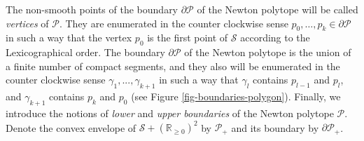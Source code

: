 \documentclass[12pt]{amsart}
\newtheorem{proposition}[theorem]{Proposition}
\begin{document}
The non-smooth points of the boundary $\partial\mathcal{P}$ of the Newton polytope will be called \emph{vertices} of $\mathcal{P}$. They are enumerated in the counter clockwise sense $p_{0},\dots,p_{k}\in\partial\mathcal{P}$ in such a way that the vertex $p_{0}$ is the first point of $\mathcal{S}$ according to the Lexicographical order. The boundary $\partial\mathcal{P}$ of the Newton polytope is the union of a finite number of compact segments, and they also will be enumerated in the counter clockwise sense $\gamma_{1}, ..., \gamma_{k+1}$ in such a way that $\gamma_{l}$ contains $p_{l-1}$ and $p_{l}$, and $\gamma_{k+1}$ contains $p_{k}$ and $p_{0}$ (see Figure \ref{fig-boundaries-polygon}). Finally, we introduce the notions of \emph{lower} and \emph{upper boundaries} of the Newton polytope $\mathcal{P}$. Denote the convex envelope of $\mathcal{S} + (\mathbb{R}_{\geq0})^{2}$ by $\mathcal{P}_{+}$ and its boundary by $\partial\mathcal{P}_{+}$.





\end{document}
